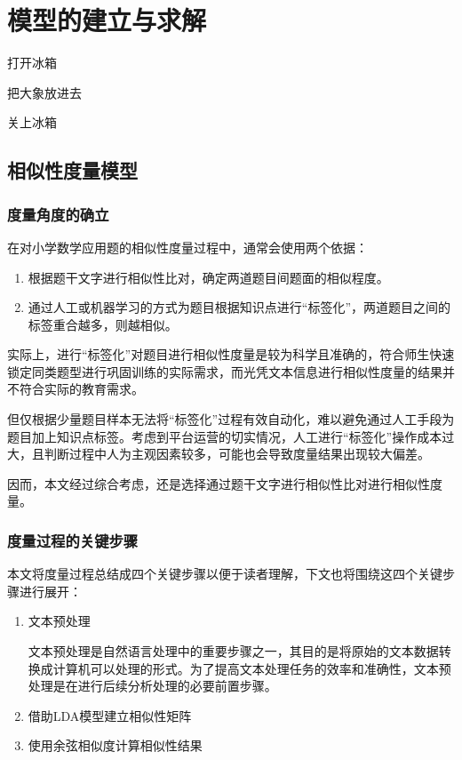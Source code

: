 \section{模型的建立与求解}

\begin{mgAlgorithm}
    \item 打开冰箱
    \item 把大象放进去
    \item 关上冰箱
\end{mgAlgorithm}

\subsection{相似性度量模型}

\subsubsection{度量角度的确立}

在对小学数学应用题的相似性度量过程中，通常会使用两个依据：

\begin{enumerate}
    \item 根据题干文字进行相似性比对，确定两道题目间题面的相似程度。
    \item 通过人工或机器学习的方式为题目根据知识点进行“标签化”，两道题目之间的标签重合越多，则越相似。
\end{enumerate}

实际上，进行“标签化”对题目进行相似性度量是较为科学且准确的，符合师生快速锁定同类题型进行巩固训练的实际需求，而光凭文本信息进行相似性度量的结果并不符合实际的教育需求。

但仅根据少量题目样本无法将“标签化”过程有效自动化，难以避免通过人工手段为题目加上知识点标签。考虑到平台运营的切实情况，人工进行“标签化”操作成本过大，且判断过程中人为主观因素较多，可能也会导致度量结果出现较大偏差。

因而，本文经过综合考虑，还是选择通过题干文字进行相似性比对进行相似性度量。

\subsubsection{度量过程的关键步骤}


本文将度量过程总结成四个关键步骤以便于读者理解，下文也将围绕这四个关键步骤进行展开：

\begin{enumerate}
    \item 文本预处理
    
    文本预处理是自然语言处理中的重要步骤之一，其目的是将原始的文本数据转换成计算机可以处理的形式。为了提高文本处理任务的效率和准确性，文本预处理是在进行后续分析处理的必要前置步骤。

    \item 借助LDA模型建立相似性矩阵
    \item 使用余弦相似度计算相似性结果
\end{enumerate}

